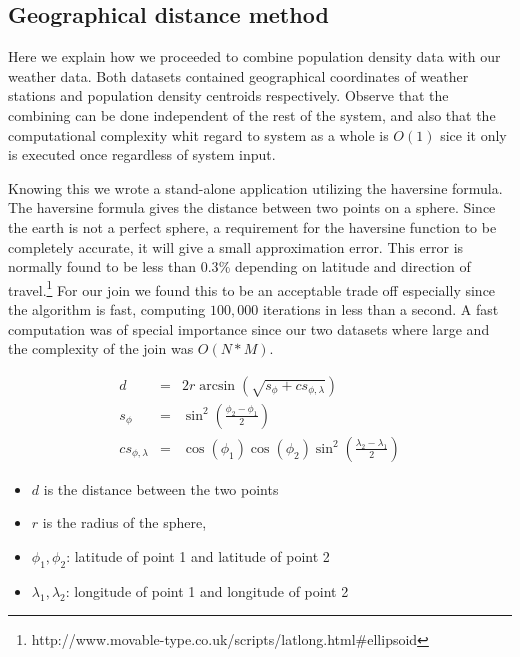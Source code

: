 \documentclass[
10pt, %
a4paper, %
oneside, %
headinclude,footinclude, %
useAMS,
usenatbib
]{mn2e}  %
\begin{document}
\subsection{Geographical distance method}
Here we explain how we proceeded to combine population density data with our weather data.
Both datasets contained geographical coordinates of weather stations and population density centroids respectively. Observe that the combining can be done independent of the rest of the system, and also that the computational complexity whit regard to system as a whole is $O(1)$ sice it only is executed once regardless of system input.

Knowing this we wrote a stand-alone application utilizing the haversine formula. The haversine formula gives the distance between two points on a sphere. Since the earth is not a perfect sphere, a requirement for the haversine function to be completely accurate, it will give a small approximation error. This error is normally found to be less than $0.3$\% depending on latitude and direction of travel.\footnote{http://www.movable-type.co.uk/scripts/latlong.html\#ellipsoid}
For our join we found this to be an acceptable trade off especially since the algorithm is fast, computing $100,000$ iterations in less than a second. A fast computation was of special importance since our two datasets where large and the complexity of the join was $O(N*M)$.

\begin{eqnarray}
 d &=& 2r\arcsin\left(\sqrt{s_\phi + cs_{\phi,\lambda}}\right)\\
 s_\phi &=& \sin^2\left(\frac{\phi_2-\phi_1}{2}\right)\\
 cs_{\phi,\lambda} &=& \cos(\phi_1)\cos(\phi_2)\sin^2\left(\frac{\lambda_2-\lambda_1}{2}\right)
\end{eqnarray}

\begin{itemize}
\item $d$ is the distance between the two points
\item $r$ is the radius of the sphere,
\item $\phi_1, \phi_2 $: latitude of point 1 and latitude of point 2
\item $\lambda_1, \lambda_2$: longitude of point 1 and longitude of point 2
\end{itemize}
\end{document}
